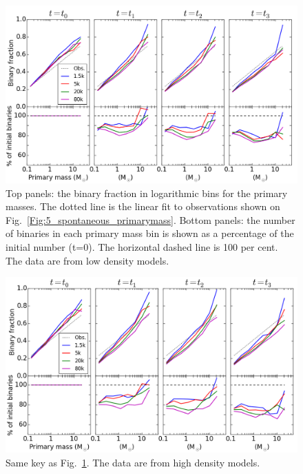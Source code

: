 \begin{figure}
\begin{center}
\includegraphics[width=\textwidth]{Figures/6_BinFrac_vs_mass_LD}
\caption{ Top panels: the binary fraction in logarithmic bins for the primary masses. The dotted line is the linear fit to observations shown on Fig.~\protect\ref{Fig:5_spontaneous_primarymass}. Bottom panels: the number of binaries in each primary mass bin is shown as a percentage of the initial number (t=0). The horizontal dashed line is 100 per cent. The data are from low density models.}
\label{Fig:6_BinFracVsMass_LD}
\end{center}
\end{figure}


\begin{figure}
\begin{center}
\includegraphics[width=\textwidth]{Figures/6_BinFrac_vs_mass_HD}
\caption{ Same key as Fig.~\protect\ref{Fig:6_BinFracVsMass_LD}.  The data are from high density models.}
\label{Fig:6_BinFracVsMass_HD}
\end{center}
\end{figure}



